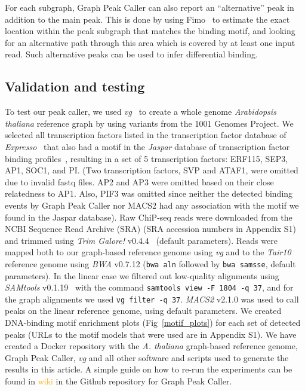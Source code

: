 \documentclass[10pt,letterpaper]{article}
\newcommand{\revision}[1]{\textcolor{orange}{#1}}
\begin{document}
For each subgraph, Graph Peak Caller can also report an “alternative” peak in addition to the main peak.
This is done by using Fimo~\cite{fimo} to estimate the exact location within the peak subgraph that matches the binding motif, and looking for an alternative path through this area which is covered by at least one input read.
Such alternative peaks can be used to infer differential binding.

\subsection*{Validation and testing}
To test our peak caller, we used \emph{vg}~\cite{vg} to create a whole genome \emph{Arabidopsis thaliana} reference graph by using variants from the 1001 Genomes Project.
We selected all transcription factors listed in the transcription factor database of \emph{Expresso}~\cite{expresso} that also had a motif in the \emph{Jaspar} database of transcription factor binding profiles~\cite{jaspar}, resulting in a set of 5 transcription factors: ERF115, SEP3, AP1, SOC1, and PI.
(Two transcription factors, SVP and ATAF1, were omitted due to invalid fastq files. AP2 and AP3 were omitted based on their close relatedness to AP1. Also, PIF3 was omitted since neither the detected binding events by Graph Peak Caller nor MACS2 had any association with the motif we found in the Jaspar database).
Raw ChiP-seq reads were downloaded from the NCBI Sequence Read Archive (SRA) (SRA accession numbers in Appendix S1) and trimmed using \emph{Trim Galore!} v0.4.4~\cite{trim_galore} (default parameters).
Reads were mapped both to our graph-based reference genome using \emph{vg} and to the \emph{Tair10}~\cite{tair} reference genome using \emph{BWA} v0.7.12 (\texttt{bwa aln} followed by \texttt{bwa samsse}, default parameters).
In the linear case we filtered out low-quality alignments using \emph{SAMtools} v0.1.19~\cite{samtools} with the command \texttt{samtools view -F 1804 -q 37}, and for the graph alignments we used \texttt{vg filter -q 37}.
\emph{MACS2} v2.1.0 was used to call peaks on the linear reference genome, using default parameters. We created DNA-binding motif enrichment plots (Fig~\ref{motif_plots}) for each set of detected peaks (URLs to the motif models that were used are in Appendix S1). We have created a Docker repository with the \emph{A. thaliana} graph-based reference genome, Graph Peak Caller, \emph{vg} and all other software and scripts used to generate the results in this article. A simple guide on how to re-run the experiments can be found in \revision{wiki} in the Github repository for Graph Peak Caller.
\end{document}
